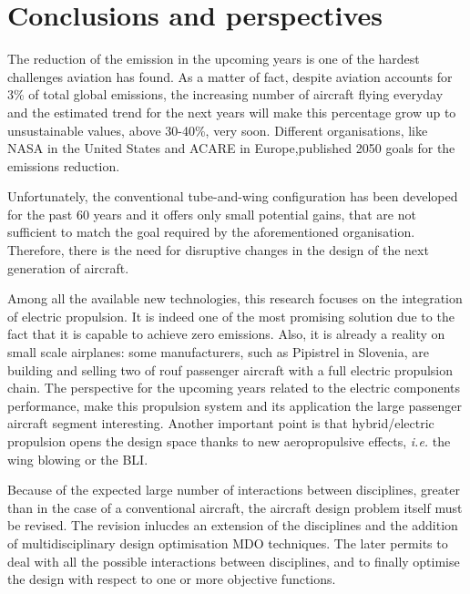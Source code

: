 \chapter*{Conclusions and perspectives}
\mtcaddchapter 

The reduction of the emission in the upcoming years is one of the hardest challenges aviation has found.
As a matter of fact, despite aviation accounts for 3\% of total global emissions, the increasing number of aircraft flying everyday and the estimated trend for the next years will make this percentage grow up to unsustainable values, above 30-40\%, very soon. 
Different organisations, like NASA in the United States and ACARE in Europe,published 2050 goals for the emissions reduction. 

Unfortunately, the conventional tube-and-wing configuration has been developed for the past 60 years and it offers only small potential gains, that are not sufficient to match the goal required by the aforementioned organisation. 
Therefore, there is the need for disruptive changes in the design of the next generation of aircraft.

Among all the available new technologies, this research focuses on the integration of electric propulsion. 
It is indeed one of the most promising solution due to the fact that it is capable to achieve zero emissions.
Also, it is already a reality on small scale airplanes: some manufacturers, such as Pipistrel in Slovenia, are building and selling two of rouf passenger aircraft with a full electric propulsion chain. 
The perspective for the upcoming years related to the electric components performance, make this propulsion system and its application the large passenger aircraft segment interesting.
Another important point is that hybrid/electric propulsion opens the design space thanks to new aeropropulsive effects, \textit{i.e.} the wing blowing or the BLI. 

Because of the expected large number of interactions between disciplines, greater than in the case of a conventional aircraft, the aircraft design problem itself must be revised. 
The revision inlucdes an extension of the disciplines and the addition of multidisciplinary design optimisation MDO techniques.
The later permits to deal with all the possible interactions between disciplines, and to finally optimise the design with respect to one or more objective functions. 

